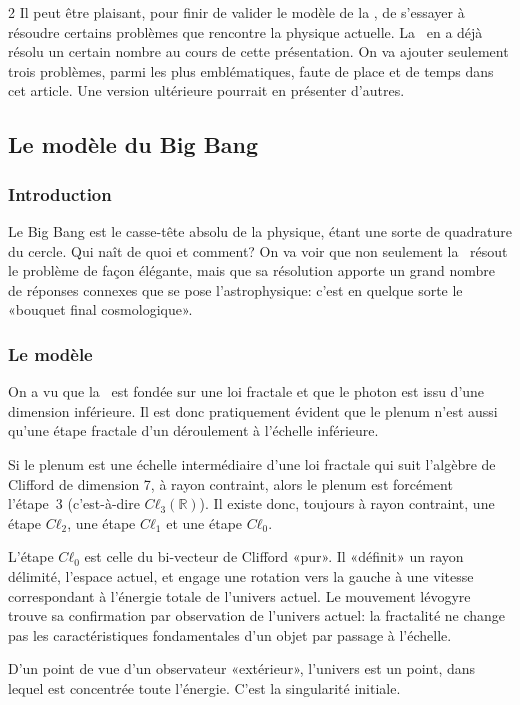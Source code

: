 \begin{multicols}{2}
Il peut être plaisant, pour finir de valider le modèle de la \PQ, de
s'essayer à résoudre certains problèmes que rencontre la physique
actuelle. La \PQ\ en a déjà résolu un certain nombre au cours de cette
présentation. On va ajouter seulement trois problèmes, parmi les plus
emblématiques, faute de place et de temps dans cet article. Une version ultérieure pourrait en présenter d'autres.

\subsection{Le modèle du Big Bang}

\subsubsection{Introduction}

Le Big Bang est le casse-tête absolu de la physique, étant une sorte
de quadrature du cercle. Qui naît de quoi et comment? On va voir que
non seulement la \PQ\ résout le problème de façon élégante, mais que
sa résolution apporte un grand nombre de réponses connexes que se
pose l'astrophysique: c'est en quelque sorte le «bouquet final
cosmologique».

\subsubsection{Le modèle}

On a vu que la \PQ\ est fondée sur une loi fractale et que le photon est
issu d'une dimension inférieure. Il est donc pratiquement évident 
que le plenum n'est aussi qu'une étape fractale d'un déroulement à
l'échelle inférieure.

Si le plenum est une échelle intermédiaire d'une loi fractale qui suit
l'algèbre de Clifford de dimension 7, à rayon contraint, alors le plenum est
forcément l'étape~3 (c'est-à-dire $Cℓ_3(\mathbb{R})$). Il existe donc, toujours
à rayon contraint, une étape $Cℓ_2$, une étape $Cℓ_1$ et une étape $Cℓ_0$.

L'étape $Cℓ_0$ est celle du bi-vecteur de Clifford «pur». Il
«définit» un rayon délimité, l'espace actuel, et engage une rotation
vers la gauche à une vitesse correspondant à l'énergie totale de
l'univers actuel. Le mouvement lévogyre trouve sa confirmation par
observation de l'univers actuel: la fractalité ne change pas les
caractéristiques fondamentales d'un objet par passage à l'échelle.

D'un point de vue d'un observateur «extérieur», l'univers est un
point, dans lequel est concentrée toute l'énergie. C'est la singularité
initiale.


\end{multicols}

